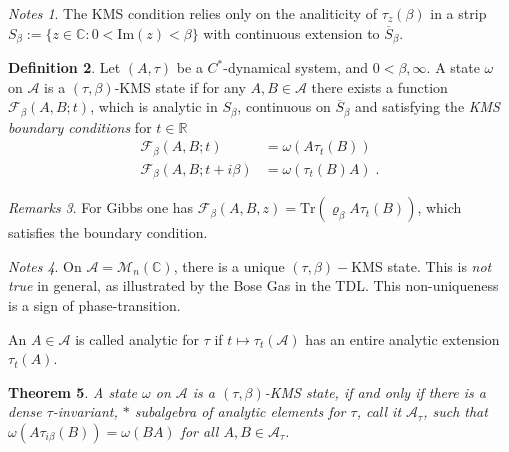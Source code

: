 \documentclass[
a4paper, %
11pt, %
onecolumn, %
openany, %
]{memoir}
\theoremstyle{definition}
\newtheorem{definition}{Definition}[chapter]
\theoremstyle{remark}
\newtheorem{remarks}[definition]{Remarks}
\newtheorem{notes}[definition]{Notes}
\theoremstyle{plain}
\newtheorem{theorem}[definition]{Theorem}
\begin{document}
\begin{notes}The KMS condition relies only on the analiticity of $\tau_z(\beta)$ in a strip $S_{\beta}:=\{z\in \mathbb{C}:0<\mathrm{Im}(z)<\beta\}$ with continuous extension to $\overline{S}_{\beta}$.
	\end{notes}
\begin{definition}
	Let $(A,\tau)$ be a $C^*$-dynamical system, and $0<\beta,\infty$. A state $\omega$ on $\mathcal{A}$ is a $(\tau,\beta)$-KMS state if for any $A,B\in \mathcal{A}$ there exists a function $\mathcal{F}_{\beta}(A,B;t)$, which is analytic in $S_{\beta}$, continuous on $\overline{S}_{\beta}$ and satisfying the \textit{KMS boundary conditions} for $t\in\mathbb{R}$ \begin{align}
	\mathcal{F}_{\beta}(A,B;t)&=\omega(A\tau_t(B))\\
	\mathcal{F}_{\beta}(A,B;t+i\beta)&=\omega(\tau_t(B)A)\; .
	\end{align}
\end{definition}
\begin{remarks}
	For Gibbs one has $\mathcal{F}_{\beta}(A,B,z)=\mathrm{Tr}(\varrho_{\beta}A\tau_t(B))$, which satisfies the boundary condition.
\end{remarks}
\begin{notes}
	On $\mathcal{A}=\mathcal{M}_n(\mathbb{C})$, there is a unique $(\tau,\beta)-$KMS state. This is \textit{not true} in general, as illustrated by the Bose Gas in  the TDL. This non-uniqueness is a sign of phase-transition.
\end{notes}
An $A\in\mathcal{A}$ is called analytic for $\tau$ if $t\mapsto \tau_t(\mathcal{A})$ has an entire analytic extension $\tau_t(A)$.
\begin{theorem}
	A state $\omega$ on $\mathcal{A}$ is a $(\tau,\beta)$-KMS state, if and only if there is a dense $\tau$-invariant, $*$ subalgebra of analytic elements for $\tau$, call it $\mathcal{A}_{\tau}$, such that $\omega(A\tau_{i\beta}(B))=\omega(BA)$ for all $A,B\in \mathcal{A}_{\tau}$.
\end{theorem}
\end{document}
